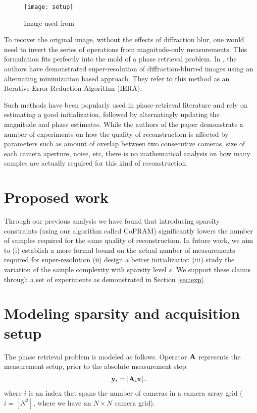 \documentclass{article} %
\begin{document}
\begin{figure}[!h]

		\centering
\texttt{[image: setup]}
\caption{Image used from \cite{holloway2016toward}}
	\label{fig:setup}
\end{figure}

To recover the original image, without the effects of diffraction blur, one would need to invert the series of operations from magnitude-only measurements. This formulation fits perfectly into the mold of a phase retrieval problem. In \cite{holloway2016toward}, the authors have demonstrated super-resolution of diffraction-blurred images using an alternating minimization based approach. They refer to this method as an Iterative Error Reduction Algorithm (IERA).  

Such methods have been popularly used in phase-retrieval literature and rely on estimating a good initialization, followed by alternatingly updating the magnitude and phase estimates. While the authors of the paper \cite{holloway2016toward} demonstrate a number of experiments on how the quality of reconstruction is affected by parameters such as amount of overlap between two consecutive cameras, size of each camera aperture, noise, etc, there is no mathematical analysis on how many samples are actually required for this kind of reconstruction. 

\section{Proposed work}

Through our previous analysis \cite{jagatap2017phase} we have found that introducing sparsity constraints (using our algorithm called CoPRAM) significantly lowers the number of samples required for the same quality of reconstruction. In future work, we aim to (i) establish a more formal bound on the actual number of measurements required for super-resolution (ii) design a better initialization (iii) study the variation of the sample complexity with sparsity level $s$. We support these claims through a set of experiments as demonstrated in Section \ref{sec:exp}.

\section{Modeling sparsity and acquisition setup}
The phase retrieval problem is modeled as follows. Operator $\mathbf{A}$ represents the measurement setup, prior to the absolute measurement step:
\begin{align}
\mathbf{y}_i = \left|\mathbf{A}_i \mathbf{x}\right|.
\end{align}
where $i$ is an index that spans the number of cameras in a camera array grid ($i=[N^2]$, where we have an $N \times N$ camera grid).
\end{document}

